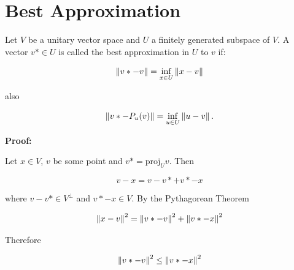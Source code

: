 \section{Best Approximation}

Let \(V\) be a unitary vector space and \(U\) a finitely generated subspace of \(V\). A vector \(v* \in U\) is called the best approximation in 
\(U\) to \(v\) if:

\[
    \left\| v* - v \right\| = \inf_{x \in U}\left\| x - v \right\|
\]

also

\[
    \left\| v* - P_u(v) \right\| = \inf_{u \in U}\left\| u - v \right\|.
\]

\textbf{Proof:}

Let \(x \in V\), \(v\) be some point and \(v* = \mathrm{proj}_{U} v\). Then 

\[
    v - x = v - v* + v* - x
\]

where \(v - v* \in V^{\bot}\) and \(v* - x \in V\). By the Pythagorean Theorem

\[
    \left\|  x - v  \right\|^2 = \left\| v* - v \right\|^2 + \left\| v* - x \right\|^2
\]

Therefore

\[
    \left\| v* - v \right\|^2 \le \left\| v* - x \right\|^2
\]

\QED

